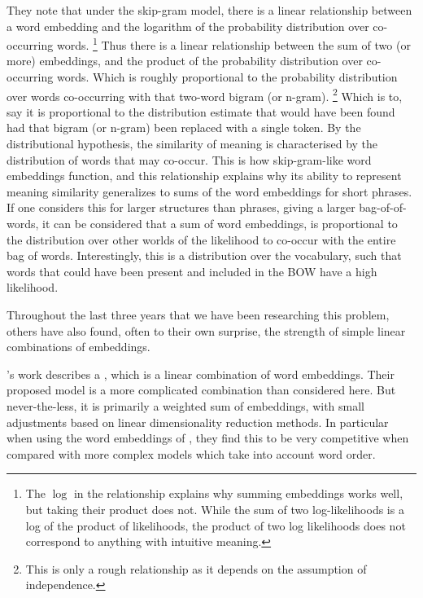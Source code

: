 \documentclass{book}
\begin{document}
They note that under the skip-gram model,
there is a linear relationship between a word embedding and the logarithm of the probability distribution over co-occurring words.%
\footnote{The $\log$ in the relationship explains why summing embeddings works well, but taking their product does not. While the sum of two log-likelihoods is a log of the product of likelihoods, the product of two log likelihoods does not correspond to anything with intuitive meaning.}
Thus there is a linear relationship between the sum of two (or more) embeddings,
and the product of the probability distribution over co-occurring words.
Which is roughly proportional to the probability distribution over words co-occurring with that two-word bigram (or n-gram).%
\footnote{This is only a rough relationship as it depends on the assumption of independence.}
Which is to, say it is proportional to the distribution estimate that would have been found had that bigram (or n-gram) been replaced with a single token.
By the distributional hypothesis, the similarity of meaning is characterised by the distribution of words that may co-occur.
This is how skip-gram-like word embeddings function, and this relationship explains why its ability to represent meaning similarity generalizes to sums of the word embeddings for short phrases.
If one considers this for larger structures than phrases, giving a larger bag-of-of-words,
it can be considered that a sum of word embeddings,
is proportional to the distribution over other worlds of the likelihood to co-occur with the entire bag of words.
Interestingly, this is a distribution over the vocabulary, such that words that could have been present and included in the BOW have a high likelihood.







Throughout the last three years that we have been researching this problem,
others have also found, often to their own surprise,
the strength of simple linear combinations of embeddings.

\citet{arora2016simple}'s work describes a ,
which is a linear combination of word embeddings.
Their proposed model is a more complicated combination than considered here.
But never-the-less, it is primarily a weighted sum of embeddings, with small adjustments based on linear dimensionality reduction methods.
In particular when using the word embeddings of \citet{wieting2015towards}, they find this to be very competitive when compared with more complex models which take into account word order.
\end{document}
